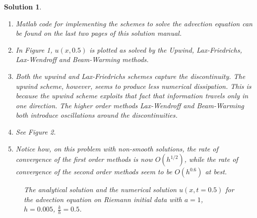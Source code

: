 \documentclass[10pt,letterpaper]{article}
\newcommand{\frb}[1]{ \left(  {#1} \right) }
\theoremstyle{break}
\newtheorem{mysolution}{Solution}
\newenvironment{solution}{\begin{mysolution}}{\end{mysolution}}
\begin{document}
\begin{solution}
	\begin{enumerate}
		\item
		Matlab code for implementing the schemes to solve the advection equation can be found on the last two pages of this solution manual.
		
		\item
		In Figure 1, $u\frb{x,0.5}$ is plotted as solved by the Upwind, Lax-Friedrichs, Lax-Wendroff and Beam-Warming methods.
		
		\item
		Both the upwind and Lax-Friedrichs schemes capture the discontinuity.
		The upwind scheme, however, seems to produce less numerical dissipation.
		This is because the upwind scheme exploits that fact that information travels only in one direction.
		The higher order methods Lax-Wendroff and Beam-Warming both introduce oscillations around the discontinuities.
		
		\item[(d),(e)]
		\addtocounter{enumii}{2}
		See Figure 2.
		
		
		\item
		Notice how, on this problem with non-smooth solutions, the rate of convergence of the first order methods is now $O\frb{h^{1/2}}$, while the rate of convergence of the second order methods seem to be $O\frb{h^{0.6}}$ at best.
    \end{enumerate}
		
		
		
		
		
    \newpage
    \begin{figure}[H] 
    \begin{center}
    \caption{ The analytical solution and the numerical solution $u(x,t=0.5)$ for the advection equation on Riemann initial data with $a=1$, $h=0.005$, $\frac{k}{h}=0.5$.} 
    \end{center}
    \end{figure}
    

\end{solution}
\end{document}
